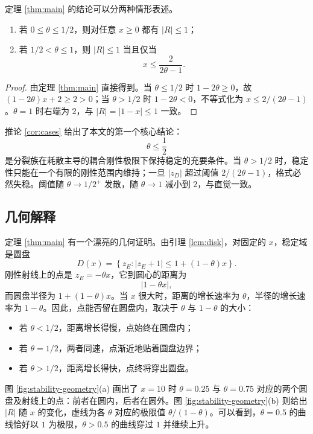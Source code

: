 定理 \ref{thm:main} 的结论可以分两种情形表述。

\begin{corollary}
  \label{cor:cases}
  \begin{enumerate}[label=(\arabic*),leftmargin=2.4em]
    \item 若 $0\le\theta\le1/2$，则对任意 $x\ge0$ 都有 $|R|\le1$；
    \item 若 $1/2<\theta\le1$，则 $|R|\le1$ 当且仅当
    \begin{equation}
      x\le\frac{2}{2\theta-1}.
      \label{eq:finite-threshold}
    \end{equation}
  \end{enumerate}
\end{corollary}

\begin{proof}
  由定理 \ref{thm:main} 直接得到。当 $\theta\le1/2$ 时 $1-2\theta\ge0$，故 $(1-2\theta)x+2\ge2>0$；当 $\theta>1/2$ 时 $1-2\theta<0$，不等式化为 $x\le2/(2\theta-1)$。$\theta=1$ 时右端为 $2$，与 $|R|=|1-x|\le1$ 一致。
\end{proof}

推论 \ref{cor:cases} 给出了本文的第一个核心结论：
\begin{equation}
  \boxed{\ \theta\le\frac12\ }
  \label{eq:theta-half}
\end{equation}
是分裂族在耗散主导的耦合刚性极限下保持稳定的充要条件。当 $\theta>1/2$ 时，稳定性只能在一个有限的刚性范围内维持；一旦 $|z_D|$ 超过阈值 $2/(2\theta-1)$，格式必然失稳。阈值随 $\theta\to1/2^+$ 发散，随 $\theta\to1$ 减小到 $2$，与直觉一致。

\subsection{几何解释}

定理 \ref{thm:main} 有一个漂亮的几何证明。由引理 \ref{lem:disk}，对固定的 $x$，稳定域是圆盘
\begin{equation}
  D(x)=\left\{z_E:|z_E+1|\le1+(1-\theta)x\right\}.
\end{equation}
刚性射线上的点是 $z_E=-\theta x$，它到圆心的距离为
\begin{equation}
  |1-\theta x|,
\end{equation}
而圆盘半径为 $1+(1-\theta)x$。当 $x$ 很大时，距离的增长速率为 $\theta$，半径的增长速率为 $1-\theta$。因此，点能否留在圆盘内，取决于 $\theta$ 与 $1-\theta$ 的大小：
\begin{itemize}[leftmargin=2.2em]
  \item 若 $\theta<1/2$，距离增长得慢，点始终在圆盘内；
  \item 若 $\theta=1/2$，两者同速，点渐近地贴着圆盘边界；
  \item 若 $\theta>1/2$，距离增长得快，点终将穿出圆盘。
\end{itemize}
图 \ref{fig:stability-geometry}(a) 画出了 $x=10$ 时 $\theta=0.25$ 与 $\theta=0.75$ 对应的两个圆盘及射线上的点：前者在圆内，后者在圆外。图 \ref{fig:stability-geometry}(b) 则给出 $|R|$ 随 $x$ 的变化，虚线为各 $\theta$ 对应的极限值 $\theta/(1-\theta)$。可以看到，$\theta=0.5$ 的曲线恰好以 $1$ 为极限，$\theta>0.5$ 的曲线穿过 $1$ 并继续上升。

